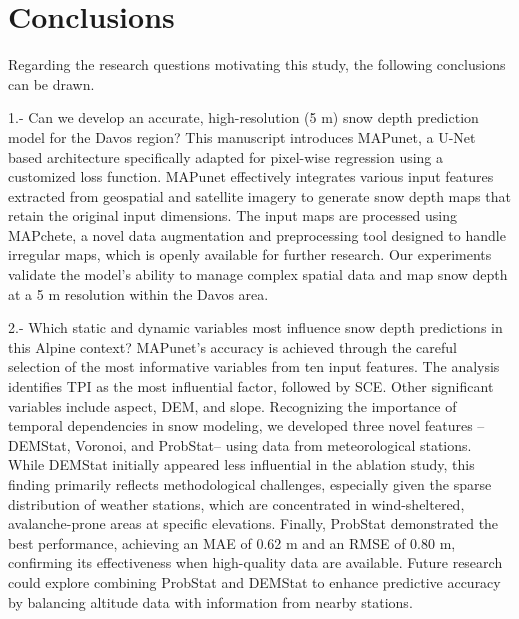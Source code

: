 \documentclass[preprint,12pt]{elsarticle}
\begin{document}
{\section{Conclusions} \label{Sec:discussion}

Regarding the research questions motivating this study, the following conclusions can be drawn.

1.- Can we develop an accurate, high-resolution (5 m) snow depth prediction model for the Davos region?
This manuscript introduces MAPunet, a U-Net based architecture specifically adapted for pixel-wise regression using a customized loss function. MAPunet effectively integrates various input features extracted from geospatial and satellite imagery to generate snow depth maps that retain the original input dimensions. The input maps are processed using MAPchete, a novel data augmentation and preprocessing tool designed to handle irregular maps, which is openly available for further research. Our experiments validate the model’s ability to manage complex spatial data and map snow depth at a 5 m resolution within the Davos area. 


2.- Which static and dynamic variables most influence snow depth predictions in this Alpine context? MAPunet's accuracy is achieved through the careful selection of the most informative variables from ten input features. The analysis identifies TPI as the most influential factor, followed by SCE. Other significant variables include aspect, DEM, and slope. Recognizing the importance of temporal dependencies in snow modeling, we developed three novel features --DEMStat, Voronoi, and ProbStat-- using data from meteorological stations. While DEMStat initially appeared less influential in the ablation study, this finding primarily reflects methodological challenges, especially given the sparse distribution of weather stations, which are concentrated in wind-sheltered, avalanche-prone areas at specific elevations. Finally, ProbStat demonstrated the best performance, achieving an MAE of 0.62 m and an RMSE of 0.80 m, confirming its effectiveness when high-quality data are available. Future research could explore combining ProbStat and DEMStat to enhance predictive accuracy by balancing altitude data with information from nearby stations.


}
\end{document}
